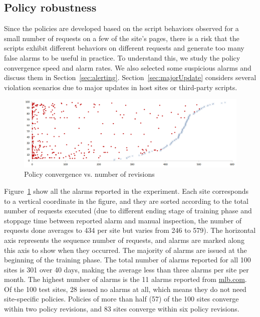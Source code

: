 \subsection{Policy robustness}\label{sec:robustnessResults} 

Since the policies are developed based on the script behaviors observed
for a small number of requests on a few of the site's pages, there is a
risk that the scripts exhibit different behaviors on different requests
and generate too many false alarms to be useful in practice.  To
understand this, we study the policy convergence speed and alarm rates.
We also selected some suspicious alarms and discuss them in
Section~\ref{sec:alerting}.  Section~\ref{sec:majorUpdate} considers
several violation scenarios due to major updates in host sites or
third-party scripts.

\begin{figure}[bt]
\centering
\captionsetup{justification=centering}
\includegraphics[width=\textwidth]{figures/chapter6/data.png}
\caption{Policy convergence vs. number of revisions}
\label{fig:convergeVSrevisions}
\end{figure}

Figure~\ref{fig:convergeVSrevisions} show all the alarms \st reported in
the experiment.  Each site corresponds to a vertical coordinate in the
figure, and they are sorted according to the total number of requests
executed (due to different ending stage of training phase and stoppage
time between reported alarm and manual inspection, the number of
requests done averages to 434 per site but varies from 246 to 579).
The horizontal axis represents the sequence number of requests, and
alarms are marked along this axis to show when they occurred.  The
majority of alarms are issued at the beginning of the training phase.
The total number of alarms \st reported for all 100 sites is 301 over 40
days, making the average less than three alarms per site per month.  The
highest number of alarms is the 11 alarms reported from \url{mlb.com}.
Of the 100 test sites, 28 issued no alarms at all, which means they do
not need site-specific policies.  Policies of more than half (57) of the
100 sites converge within two policy revisions, and 83 sites converge
within six policy revisions.

